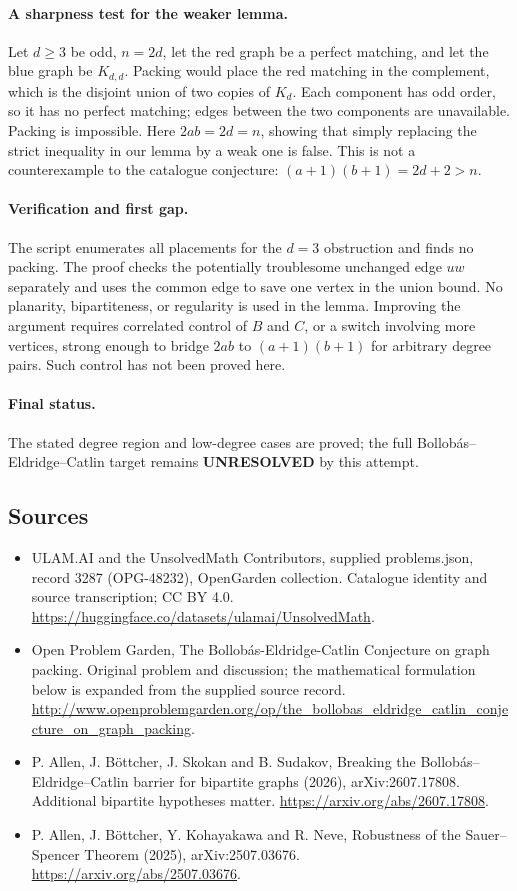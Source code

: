 \documentclass[11pt,a4paper]{article}
\begin{document}
\paragraph{A sharpness test for the weaker lemma.}
Let $d\ge3$ be odd, $n=2d$, let the red graph be a perfect matching, and let the blue graph be $K_{d,d}$. Packing would place the red matching in the complement, which is the disjoint union of two copies of $K_d$. Each component has odd order, so it has no perfect matching; edges between the two components are unavailable. Packing is impossible. Here $2ab=2d=n$, showing that simply replacing the strict inequality in our lemma by a weak one is false. This is not a counterexample to the catalogue conjecture: $(a+1)(b+1)=2d+2>n$.

\paragraph{Verification and first gap.}
The script enumerates all placements for the $d=3$ obstruction and finds no packing. The proof checks the potentially troublesome unchanged edge $uw$ separately and uses the common edge to save one vertex in the union bound. No planarity, bipartiteness, or regularity is used in the lemma. Improving the argument requires correlated control of $B$ and $C$, or a switch involving more vertices, strong enough to bridge $2ab$ to $(a+1)(b+1)$ for arbitrary degree pairs. Such control has not been proved here.

\paragraph{Final status.}
The stated degree region and low-degree cases are proved; the full Bollobás--Eldridge--Catlin target remains \textbf{UNRESOLVED} by this attempt.

\subsection{Sources}
\begin{itemize}
\item[S1] ULAM.AI and the UnsolvedMath Contributors, supplied problems.json, record 3287 (OPG-48232), OpenGarden collection. Catalogue identity and source transcription; CC BY 4.0.
\url{https://huggingface.co/datasets/ulamai/UnsolvedMath}.
\item[S2] Open Problem Garden, The Bollobás-Eldridge-Catlin Conjecture on graph packing. Original problem and discussion; the mathematical formulation below is expanded from the supplied source record.
\url{http://www.openproblemgarden.org/op/the_bollobas_eldridge_catlin_conjecture_on_graph_packing}.
\item[S3] P. Allen, J. Böttcher, J. Skokan and B. Sudakov, Breaking the Bollobás--Eldridge--Catlin barrier for bipartite graphs (2026), arXiv:2607.17808. Additional bipartite hypotheses matter.
\url{https://arxiv.org/abs/2607.17808}.
\item[S4] P. Allen, J. Böttcher, Y. Kohayakawa and R. Neve, Robustness of the Sauer--Spencer Theorem (2025), arXiv:2507.03676.
\url{https://arxiv.org/abs/2507.03676}.
\end{itemize}
\end{document}

